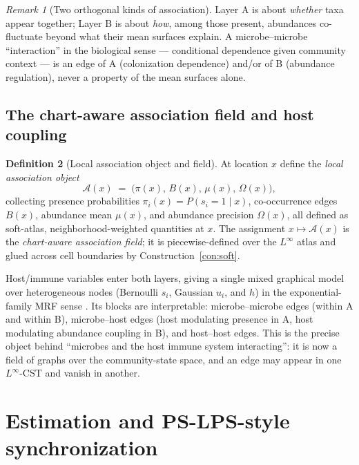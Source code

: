\documentclass[11pt]{article}
\theoremstyle{definition}
\newtheorem{definition}{Definition}[section]
\theoremstyle{plain}
\theoremstyle{remark}
\newtheorem{remark}[definition]{Remark}
\newcommand{\Linf}{L^{\infty}}
\newcommand{\1}{\mathbf{1}}
\newcommand{\Prec}{\Omega}
\newcommand{\Pres}{\pi}
\newcommand{\Edge}{B}
\newcommand{\Field}{\mathcal{A}}
\begin{document}
\begin{remark}[Two orthogonal kinds of association]\label{rem:two}
Layer A is about \emph{whether} taxa appear together; Layer B is about
\emph{how}, among those present, abundances co-fluctuate beyond what their mean
surfaces explain. A microbe--microbe ``interaction'' in the biological sense ---
conditional dependence given community context --- is an edge of A (colonization
dependence) and/or of B (abundance regulation), never a property of the mean
surfaces alone.
\end{remark}

\subsection{The chart-aware association field and host coupling}\label{sec:field}
\begin{definition}[Local association object and field]\label{def:field}
At location $x$ define the \emph{local association object}
\[
  \Field(x)\;=\;\big(\Pres(x),\,\Edge(x),\,\mu(x),\,\Prec(x)\big),
\]
collecting presence probabilities $\Pres_i(x)=P(s_i=1\mid x)$, co-occurrence
edges $\Edge(x)$, abundance mean $\mu(x)$, and abundance precision $\Prec(x)$,
all defined as soft-atlas, neighborhood-weighted quantities at $x$. The
assignment $x\mapsto\Field(x)$ is the \emph{chart-aware association field}; it is
piecewise-defined over the $\Linf$ atlas and glued across cell boundaries by
Construction~\ref{con:soft}.
\end{definition}

Host/immune variables enter both layers, giving a single mixed graphical model
over heterogeneous nodes (Bernoulli $s_i$, Gaussian $u_i$, and $h$) in the
exponential-family MRF sense \cite{mixedmgm}. Its blocks are interpretable:
microbe--microbe edges (within A and within B), microbe--host edges (host
modulating presence in A, host modulating abundance coupling in B), and
host--host edges. This is the precise object behind ``microbes and the host
immune system interacting'': it is now a field of graphs over the community-state
space, and an edge may appear in one $\Linf$-CST and vanish in another.

\section{Estimation and PS-LPS-style synchronization}\label{sec:est}
\end{document}
